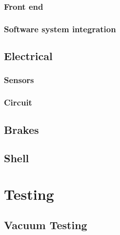 \documentclass[11pt,a4paper,oldfontcommands]{memoir}
\begin{document}
																																																																																			   \subsection{Front end}

																																																																																			   \subsection{Software system integration}

																																																																																			   \section{Electrical}

																																																																																			   \subsection{Sensors}

																																																																																			   \subsection{Circuit}

																																																																																			   \section{Brakes}

																																																																																			   \section{Shell}

																																																																																			   \chapter{Testing}

																																																																																			   \section{Vacuum Testing}
\end{document}
